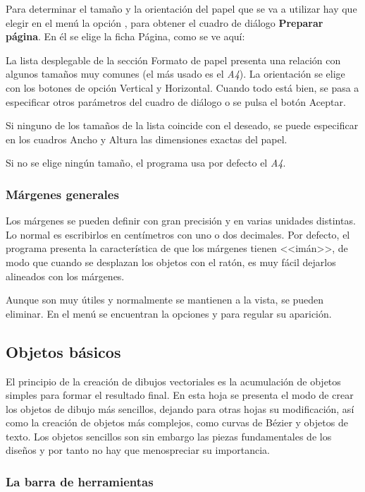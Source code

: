 Para determinar el tamaño y la orientación del papel que se va a
utilizar hay que elegir en el menú  la opción
, para obtener el cuadro de diálogo \textbf{Preparar
página}. En él se elige la ficha Página, como se ve aquí:

La lista desplegable de la sección Formato de papel presenta una
relación con algunos tamaños muy comunes (el más usado es el
\emph{A4}). La orientación se elige con los botones de opción Vertical
y Horizontal. Cuando todo está bien, se pasa a especificar otros
parámetros del cuadro de diálogo o se pulsa el botón Aceptar.

Si ninguno de los tamaños de la lista coincide con el deseado, se
puede especificar en los cuadros Ancho y Altura las dimensiones
exactas del papel.

Si no se elige ningún tamaño, el programa usa por defecto el
\emph{A4}.

\subsubsection{Márgenes generales}

Los márgenes se pueden definir con gran precisión y en varias unidades
distintas. Lo normal es escribirlos en centímetros con uno o dos
decimales. Por defecto, el programa presenta la característica de que
los márgenes tienen <<imán>>, de modo que cuando se desplazan los
objetos con el ratón, es muy fácil dejarlos alineados con los
márgenes.

Aunque son muy útiles y normalmente se mantienen a la vista, se pueden
eliminar. En el menú  se encuentran la opciones
 y  para regular su aparición.


\subsection{Objetos básicos}

El principio de la creación de dibujos vectoriales es la acumulación
de objetos simples para formar el resultado final. En esta hoja se
presenta el modo de crear los objetos de dibujo más sencillos, dejando
para otras hojas su modificación, así como la creación de objetos más
complejos, como curvas de Bézier y objetos de texto. Los objetos
sencillos son sin embargo las piezas fundamentales de los diseños y
por tanto no hay que menospreciar su importancia.

\subsubsection{La barra de herramientas}

